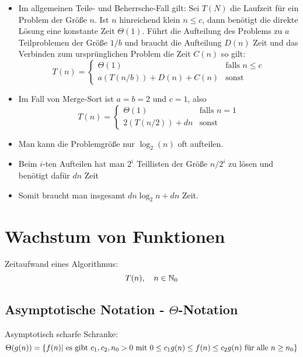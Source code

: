 \documentclass[a4paper]{scrartcl}
\begin{document}
\begin{itemize}
	\item Im allgemeinen Teile- und Beherrsche-Fall gilt: Sei $T(N)$ die Laufzeit für ein Problem der Größe $n$. Ist $n$ hinreichend klein $n \leq c$, dann benötigt die direkte Lösung eine konstante Zeit $\Theta(1)$. Führt die Aufteilung des Problems zu $a$ Teilproblemen der Größe $1/b$ und braucht die Aufteilung $D(n)$ Zeit und das Verbinden zum ursprünglichen Problem die Zeit $C(n)$ so gilt:
	$$T(n)=
	\begin{cases}
		\Theta(1) & \text{falls } n \leq c \\
		a(T(n/b)) + D(n) + C(n) & \text{sonst }
	\end{cases}$$
	\item Im Fall von Merge-Sort ist $a=b=2$ und $c=1$, also	
	$$T(n)=
	\begin{cases}
	\Theta(1) & \text{falls } n=1 \\
	2(T(n/2)) + dn & \text{sonst }
	\end{cases}$$
\end{itemize}


\begin{itemize}
	\item Man kann die Problemgröße nur $\log_2(n)$ oft aufteilen.
	\item Beim $i$-ten Aufteilen hat man $2^i$ Teillisten der Größe $n/2^i$ zu lösen und benötigt dafür $dn$ Zeit
	\item Somit braucht man insgesamt $dn\log_2n+dn$ Zeit.
\end{itemize}

\section{Wachstum von Funktionen}

Zeitaufwand eines Algorithmus:
$$T(n),\quad n\in\mathbb{N}_0$$


\subsection{Asymptotische Notation - $\Theta$-Notation}

Asymptotisch scharfe Schranke: 
$$ \Theta(g(n))=\{f(n)| \textnormal{ es gibt } c_1,c_2,n_0>0 \textnormal{ mit } 0\leq c_1 g(n) \leq f(n) \leq c_2 g(n) \textnormal{ für alle } n \geq n_0\} $$ 
\end{document}
